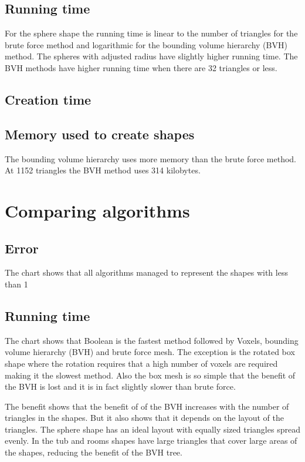 \documentclass[11pt,twoside,a4paper]{report}
\begin{document}
\subsection{Running time}

For the sphere shape the running time is linear to the number of triangles for the brute force method and logarithmic for the bounding volume hierarchy (BVH) method. The spheres with adjusted radius have slightly higher running time. The BVH methods have higher running time when there are 32 triangles or less.

\subsection{Creation time}

\subsection{Memory used to create shapes}
The bounding volume hierarchy uses more memory than the brute force method.  At 1152 triangles the BVH method uses 314 kilobytes.

\section{Comparing algorithms}

\subsection{Error}
The chart shows that all algorithms managed to represent the shapes with less than 1 %

\subsection{Running time}
The chart shows that Boolean is the fastest method followed by Voxels, bounding volume hierarchy (BVH) and brute force mesh. The exception is the rotated box shape where the rotation requires that a high number of voxels are required making it the slowest method. Also the box mesh is so simple that the benefit of the BVH is lost and it is in fact slightly slower than brute force.

The benefit shows that the benefit of of the BVH increases with the number of triangles in the shapes. But it also shows that it depends on the layout of the triangles. The sphere shape has an ideal layout with equally sized triangles spread evenly. In the tub and rooms shapes have large triangles that cover large areas of the shapes, reducing the benefit of the BVH tree.
\end{document}
